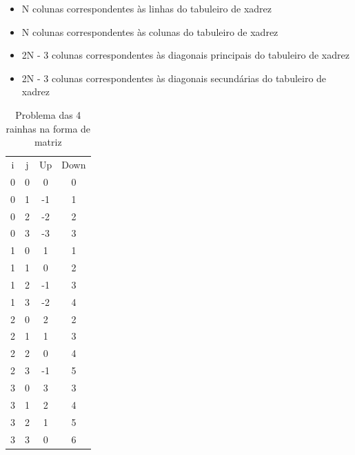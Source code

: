 \documentclass{article}
\begin{document}
\begin{itemize}
\item N colunas correspondentes às linhas do tabuleiro de xadrez
\item N colunas correspondentes às colunas do tabuleiro de xadrez
\item 2N - 3 colunas correspondentes às diagonais principais do tabuleiro de xadrez
\item 2N - 3 colunas correspondentes às diagonais secundárias do tabuleiro de xadrez
\end{itemize}

\begin{center}
  \begin{table}
  \centering
  \begin{tabular}{ c c c c }
    i & j & Up & Down  \\
    0 & 0 & 0   & 0    \\
    0 & 1 & -1  & 1    \\
    0 & 2 & -2  & 2    \\
    0 & 3 & -3  & 3    \\
    1 & 0 & 1   & 1    \\
    1 & 1 & 0   & 2    \\
    1 & 2 & -1  & 3    \\
    1 & 3 & -2  & 4    \\
    2 & 0 & 2   & 2    \\
    2 & 1 & 1   & 3    \\
    2 & 2 & 0   & 4    \\
    2 & 3 & -1  & 5    \\
    3 & 0 & 3   & 3    \\
    3 & 1 & 2   & 4    \\
    3 & 2 & 1   & 5    \\
    3 & 3 & 0   & 6    \\
  \end{tabular}
  \caption{Problema das 4 rainhas na forma de matriz}
  \label{tab:matrix_3_queens}
  \end{table}
\end{center}
\end{document}
